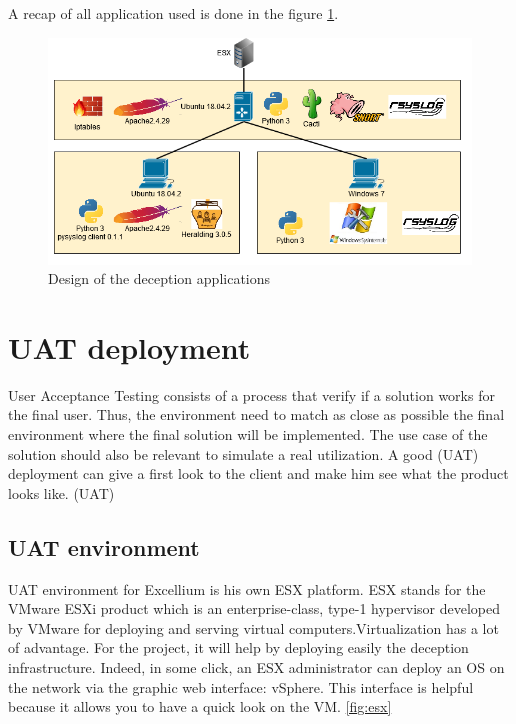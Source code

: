 \documentclass{tnreport}
\begin{document}
A recap of all application used is done in the figure \ref{fig:app}.
\begin{figure}[h!]
  \begin{center}
  \includegraphics[width=\linewidth]{figures/application}
  \caption{Design of the deception applications}
  \label{fig:app}
  \end{center}
\end{figure}

\chapter{\gls{UAT} deployment}
User Acceptance Testing consists of a process that verify if a solution works for the final user. Thus, the environment need to match as close as possible the final environment where the final solution will be implemented. The use case of the solution should also be relevant to simulate a real utilization.
A good (\gls{UAT}) deployment can give a first look to the client and make him see what the product looks like.
(\gls{UAT})
\section{\gls{UAT} environment}
 \gls{UAT} environment for \gls{Excellium} is his own ESX platform. ESX stands for the VMware ESXi product which is an enterprise-class, type-1 hypervisor developed by VMware for deploying and serving virtual computers.\eol Virtualization has a lot of advantage. For the project, it will help by deploying easily the deception infrastructure. Indeed, in some click, an ESX administrator can deploy an OS on the network via the graphic web interface: vSphere. This interface is helpful because it allows you to have a quick look on the VM. \ref{fig:esx}
\end{document}
